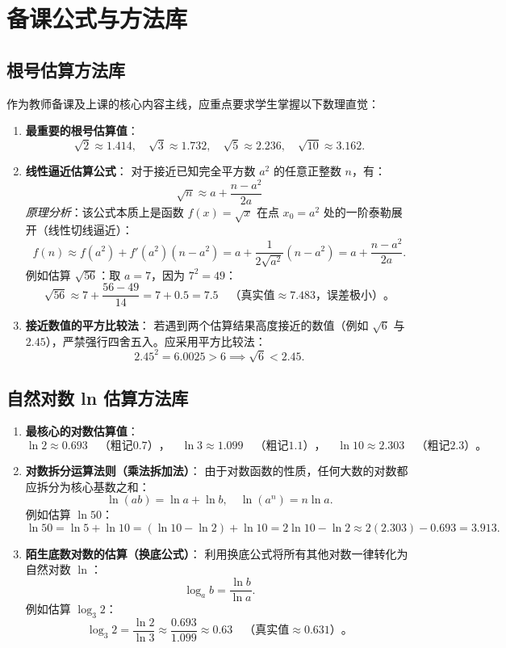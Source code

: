 \documentclass[11pt,a4paper]{ctexart}
\begin{document}
\newpage

\section{备课公式与方法库}

\subsection{根号估算方法库}
作为教师备课及上课的核心内容主线，应重点要求学生掌握以下数理直觉：

\begin{enumerate}[label=\arabic*. , leftmargin=2em, itemsep=1.2em, topsep=0.2em]
  \item \textbf{最重要的根号估算值}：
  \[
  \sqrt{2} \approx 1.414,\quad \sqrt{3} \approx 1.732,\quad \sqrt{5} \approx 2.236,\quad \sqrt{10} \approx 3.162.
  \]
  \item \textbf{线性逼近估算公式}：
  对于接近已知完全平方数 \(a^2\) 的任意正整数 \(n\)，有：
  \[
  \sqrt{n} \approx a + \frac{n - a^2}{2a}
  \]
  \textit{原理分析}：该公式本质上是函数 \(f(x) = \sqrt{x}\) 在点 \(x_0 = a^2\) 处的一阶泰勒展开（线性切线逼近）：
  \[
  f(n) \approx f(a^2) + f'(a^2)(n - a^2) = a + \frac{1}{2\sqrt{a^2}}(n - a^2) = a + \frac{n-a^2}{2a}.
  \]
  例如估算 \(\sqrt{56}\)：取 \(a = 7\)，因为 \(7^2 = 49\)：
  \[
  \sqrt{56} \approx 7 + \frac{56-49}{14} = 7 + 0.5 = 7.5 \quad （真实值 \approx 7.483，误差极小）。
  \]
  \item \textbf{接近数值的平方比较法}：
  若遇到两个估算结果高度接近的数值（例如 \(\sqrt{6}\) 与 \(2.45\)），严禁强行四舍五入。应采用平方比较法：
  \[
  2.45^2 = 6.0025 > 6 \implies \sqrt{6} < 2.45.
  \]
\end{enumerate}

\subsection{自然对数 ln 估算方法库}
\begin{enumerate}[label=\arabic*. , leftmargin=2em, itemsep=1.2em, topsep=0.2em]
  \item \textbf{最核心的对数估算值}：
  \[
  \ln 2 \approx 0.693 \quad （粗记 0.7），\quad \ln 3 \approx 1.099 \quad （粗记 1.1），\quad \ln 10 \approx 2.303 \quad （粗记 2.3）。
  \]
  \item \textbf{对数拆分运算法则（乘法拆加法）}：
  由于对数函数的性质，任何大数的对数都应拆分为核心基数之和：
  \[
  \ln(ab) = \ln a + \ln b,\quad \ln(a^n) = n\ln a.
  \]
  例如估算 \(\ln 50\)：
  \[
  \ln 50 = \ln 5 + \ln 10 = (\ln 10 - \ln 2) + \ln 10 = 2\ln 10 - \ln 2 \approx 2(2.303) - 0.693 = 3.913.
  \]
  \item \textbf{陌生底数对数的估算（换底公式）}：
  利用换底公式将所有其他对数一律转化为自然对数 \(\ln\)：
  \[
  \log_a b = \frac{\ln b}{\ln a}.
  \]
  例如估算 \(\log_3 2\)：
  \[
  \log_3 2 = \frac{\ln 2}{\ln 3} \approx \frac{0.693}{1.099} \approx 0.63 \quad （真实值 \approx 0.631）。
  \]
\end{enumerate}
\end{document}
